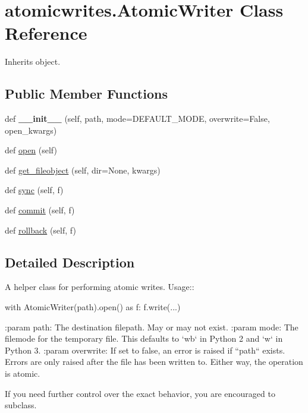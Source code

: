 \hypertarget{classatomicwrites_1_1_atomic_writer}{}\section{atomicwrites.\+Atomic\+Writer Class Reference}
\label{classatomicwrites_1_1_atomic_writer}


Inherits object.

\subsection*{Public Member Functions}
\begin{DoxyCompactItemize}
\item 
\mbox{\label{classatomicwrites_1_1_atomic_writer_a9409795de1045fa4a45f54340c41a83c}} 
def {\bfseries \+\_\+\+\_\+init\+\_\+\+\_\+} (self, path, mode=D\+E\+F\+A\+U\+L\+T\+\_\+\+M\+O\+DE, overwrite=False, open\+\_\+kwargs)
\item 
def \hyperlink{classatomicwrites_1_1_atomic_writer_ae9b0015caff3120e250c8cef66611cba}{open} (self)
\item 
def \hyperlink{classatomicwrites_1_1_atomic_writer_a768498001368a8888aca92b41a13320c}{get\+\_\+fileobject} (self, dir=None, kwargs)
\item 
def \hyperlink{classatomicwrites_1_1_atomic_writer_aea0847148c50cefc9bde2de35b4b146f}{sync} (self, f)
\item 
def \hyperlink{classatomicwrites_1_1_atomic_writer_a195872e768f238078a5d83cbfd484333}{commit} (self, f)
\item 
def \hyperlink{classatomicwrites_1_1_atomic_writer_ac8281b30b809292b03c8c403dea8d4c6}{rollback} (self, f)
\end{DoxyCompactItemize}


\subsection{Detailed Description}
\begin{DoxyVerb}A helper class for performing atomic writes. Usage::

    with AtomicWriter(path).open() as f:
        f.write(...)

:param path: The destination filepath. May or may not exist.
:param mode: The filemode for the temporary file. This defaults to `wb` in
    Python 2 and `w` in Python 3.
:param overwrite: If set to false, an error is raised if ``path`` exists.
    Errors are only raised after the file has been written to.  Either way,
    the operation is atomic.

If you need further control over the exact behavior, you are encouraged to
subclass.
\end{DoxyVerb}
 

